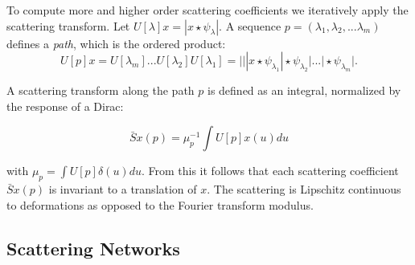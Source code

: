 To compute more and higher order scattering coefficients we iteratively apply the scattering transform. Let $U[\lambda]x = |x \star \psi_\lambda|$. A sequence $p = (\lambda_1, \lambda_2, ... \lambda_m)$ defines a \textit{path}, which is the ordered product: 
$$U[p]x = U[\lambda_m]...U[\lambda_2]U[\lambda_1] = | ||x \star \psi_{\lambda_1} | \star \psi_{\lambda_2}| ... | \star \psi_{\lambda_m}|. $$

A scattering transform along the path $p$ is defined as an integral, normalized by the response of a Dirac:

$$\bar{S}x(p) = \mu_p^{-1} \int U[p]x(u)du$$

with $\mu_p = \int U[p] \delta(u) du$. From this it follows that each scattering coefficient $\bar{S}x(p)$ is invariant to a translation of $x$. The scattering is Lipschitz continuous to deformations as opposed to the Fourier transform modulus.


\subsection{Scattering Networks}
\label{subsec:scattering_networks}


